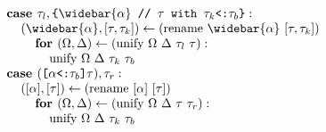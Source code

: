 \documentclass[acmsmall]{acmart}
\begin{document}
\begin{figure*}[h]
\[\begin{array}[t]{@{} l}
    \\

    \I \B{case } \tau_l, \code{\{$\widebar{\alpha}$ // $\tau$ with $\tau_k$<:$\tau_b$\}} : 
    \\
    \I\I (\widebar{\alpha}, [\tau, \tau_k]) \leftarrow (\F{rename } \widebar{\alpha}\ [\tau, \tau_k])
    \\
    \I\I\I \B{for } (\Omega, \Delta) \leftarrow (\F{unify } \Omega\ \Delta\ \tau_l\ \tau):
    \\
    \I\I\I\I \F{unify } \Omega\ \Delta\ \tau_k\ \tau_b

    \\

    \I \B{case } (\code{[$\alpha$<:$\tau_b$]$\tau$}), \tau_r : 
    \\
    \I\I ([\alpha], [\tau]) \leftarrow (\F{rename } [\alpha]\ [\tau])
    \\
    \I\I\I \B{for } (\Omega, \Delta) \leftarrow (\F{unify } \Omega\ \Delta\ \tau\ \tau_r):
    \\
    \I\I\I\I \F{unify } \Omega\ \Delta\ \tau_k\ \tau_b




\end{array}\]
\end{figure*}
\end{document}
